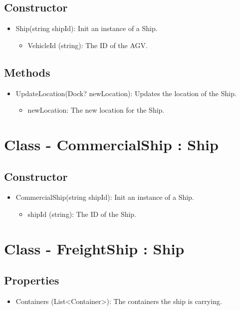 \documentclass[12pt]{article}
\begin{document}
\subsection*{Constructor}
\begin{itemize}
    \item Ship(string shipId): Init an instance of a Ship.
    \begin{itemize}
        \item VehicleId (string): The ID of the AGV.
    \end{itemize}
\end{itemize}

\subsection*{Methods}
\begin{itemize}
    \item UpdateLocation(Dock? newLocation): Updates the location of the Ship.
    \begin{itemize}
        \item newLocation: The new location for the Ship.
    \end{itemize}
\end{itemize}

\section*{Class - CommercialShip : Ship}
\subsection*{Constructor}
\begin{itemize}
    \item CommercialShip(string shipId): Init an instance of a Ship.
    \begin{itemize}
        \item shipId (string): The ID of the Ship.
    \end{itemize}
\end{itemize}

\section*{Class - FreightShip : Ship}
\subsection*{Properties}
    \begin{itemize}
        \item Containers (List<Container>): The containers the ship is carrying.
    \end{itemize}
\end{document}
